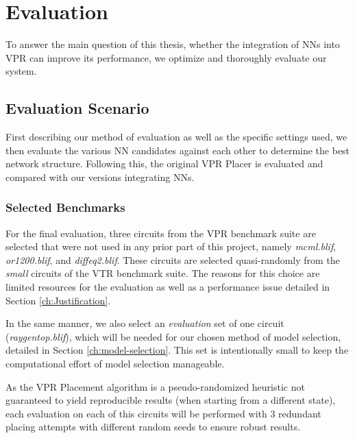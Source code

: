 
\chapter{Evaluation}\label{ch:evaluation}
\glsresetall %

To answer the main question of this thesis, whether the integration of \glspl{NN} into \gls{VPR} can improve its performance, we optimize and thoroughly evaluate our system.

\section{Evaluation Scenario}

First describing our method of evaluation as well as the specific settings used, we then evaluate the various \gls{NN} candidates against each other to determine the best network structure. Following this, the original \gls{VPR} Placer is evaluated and compared with our versions integrating \glspl{NN}.

\subsection{Selected Benchmarks}\label{ch:benchmarks}

For the final evaluation, three circuits from the \gls{VPR} benchmark suite are selected that were not used in any prior part of this project, namely \textit{mcml.blif}, \textit{or1200.blif}, and \textit{diffeq2.blif}. These circuits are selected quasi-randomly from the \textit{small} circuits of the \gls{VTR} benchmark suite. The reasons for this choice are limited resources for the evaluation as well as a performance issue detailed in Section \ref{ch:Justification}.

In the same manner, we also select an \textit{evaluation} set of one circuit (\textit{raygentop.blif}), which will be needed for our chosen method of model selection, detailed in Section \ref{ch:model-selection}. This set is intentionally small to keep the computational effort of model selection manageable.

As the \gls{VPR} Placement algorithm is a pseudo-randomized heuristic not guaranteed to yield reproducible results (when starting from a different state), each evaluation on each of this circuits will be performed with 3 redundant placing attempts with different random seeds to ensure robust results. 

